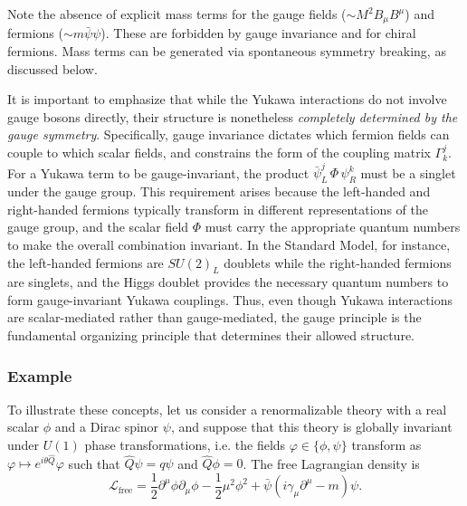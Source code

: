 Note the absence of explicit mass terms for the gauge fields ($\sim M^2 B_\mu B^\mu$) and fermions ($\sim m \bar{\psi}\psi$). These are forbidden by gauge invariance and for chiral fermions. Mass terms can be generated via spontaneous symmetry breaking, as discussed below.

It is important to emphasize that while the Yukawa interactions do not involve gauge bosons directly, their structure is nonetheless \textit{completely determined by the gauge symmetry}. Specifically, gauge invariance dictates which fermion fields can couple to which scalar fields, and constrains the form of the coupling matrix $\Gamma^j_k$. For a Yukawa term to be gauge-invariant, the product $\bar{\psi}_L^j \, \Phi \, \psi_R^k$ must be a singlet under the gauge group. This requirement arises because the left-handed and right-handed fermions typically transform in different representations of the gauge group, and the scalar field $\Phi$ must carry the appropriate quantum numbers to make the overall combination invariant. In the Standard Model, for instance, the left-handed fermions are $SU(2)_L$ doublets while the right-handed fermions are singlets, and the Higgs doublet provides the necessary quantum numbers to form gauge-invariant Yukawa couplings. Thus, even though Yukawa interactions are scalar-mediated rather than gauge-mediated, the gauge principle is the fundamental organizing principle that determines their allowed structure.

\subsubsection{Example}


To illustrate these concepts, let us consider a renormalizable theory with a real scalar $\phi$ and a Dirac spinor $\psi$, and suppose that this theory is globally invariant under $U(1)$ phase transformations, i.e. the fields $\varphi\in\{\phi,\psi\}$ transform as $\varphi\mapsto e^{i\theta \hat Q}\varphi $ such that $\hat Q \psi = q \psi$ and $\hat Q \phi=0$. The free Lagrangian density is
\begin{equation}
	\mathcal L_{\text{free}}=\frac{1}{2} \partial^{\mu} \phi \partial_{\mu} \phi-\frac{1}{2}\mu^2\phi^2+\bar{\psi}(i \gamma_\mu  \partial^\mu-m) \psi.
\end{equation}

